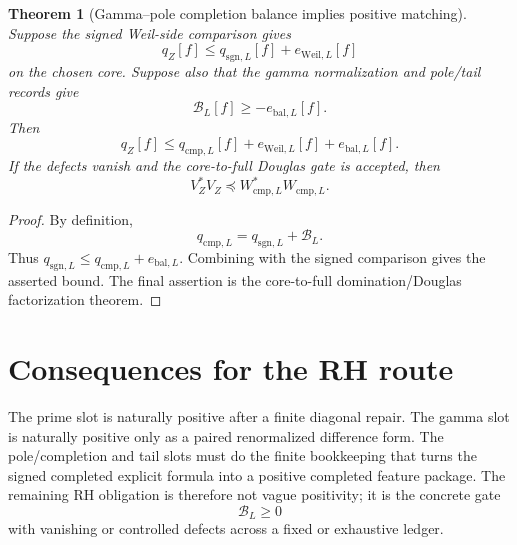 \documentclass[11pt]{article}
\newtheorem{theorem}{Theorem}
\newcommand{\sgn}{\mathrm{sgn}}
\newcommand{\cmp}{\mathrm{cmp}}
\begin{document}
\begin{theorem}[Gamma--pole completion balance implies positive matching]
Suppose the signed Weil-side comparison gives
\[
  q_Z[f]\le q_{\sgn,L}[f]+e_{\mathrm{Weil},L}[f]
\]
on the chosen core. Suppose also that the gamma normalization and pole/tail records give
\[
  \mathcal B_L[f]\ge -e_{\mathrm{bal},L}[f].
\]
Then
\[
  q_Z[f]\le q_{\cmp,L}[f]+e_{\mathrm{Weil},L}[f]+e_{\mathrm{bal},L}[f].
\]
If the defects vanish and the core-to-full Douglas gate is accepted, then
\[
  V_Z^*V_Z\preceq W_{\cmp,L}^*W_{\cmp,L}.
\]
\end{theorem}
\begin{proof}
By definition,
\[
  q_{\cmp,L}=q_{\sgn,L}+\mathcal B_L.
\]
Thus $q_{\sgn,L}\le q_{\cmp,L}+e_{\mathrm{bal},L}$. Combining with the signed comparison gives the asserted bound. The final assertion is the core-to-full domination/Douglas factorization theorem.
\end{proof}

\section{Consequences for the RH route}
The prime slot is naturally positive after a finite diagonal repair. The gamma slot is naturally positive only as a paired renormalized difference form. The pole/completion and tail slots must do the finite bookkeeping that turns the signed completed explicit formula into a positive completed feature package. The remaining RH obligation is therefore not vague positivity; it is the concrete gate
\[
  \mathcal B_L\ge0
\]
with vanishing or controlled defects across a fixed or exhaustive ledger.
\end{document}

